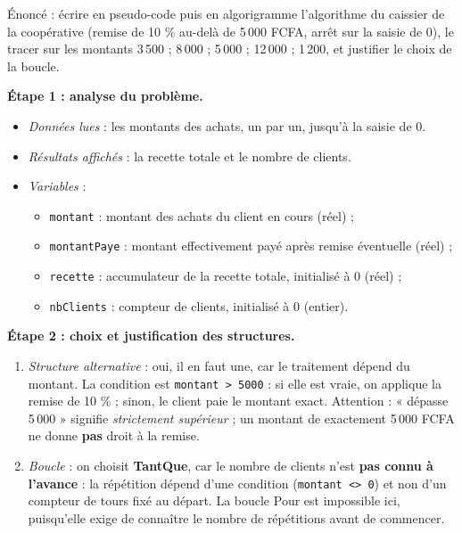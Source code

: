 \documentclass[11pt]{article}
\begin{document}
\begin{exoresolu}
Énoncé : écrire en pseudo-code puis en algorigramme l'algorithme du caissier de la coopérative (remise de 10 \% au-delà de 5\,000 FCFA, arrêt sur la saisie de 0), le tracer sur les montants 3\,500 ; 8\,000 ; 5\,000 ; 12\,000 ; 1\,200, et justifier le choix de la boucle.

\tcblower

\textbf{Étape 1 : analyse du problème.}

\begin{itemize}
\item \emph{Données lues} : les montants des achats, un par un, jusqu'à la saisie de 0.
\item \emph{Résultats affichés} : la recette totale et le nombre de clients.
\item \emph{Variables} :
\begin{itemize}
\item \texttt{montant} : montant des achats du client en cours (réel) ;
\item \texttt{montantPaye} : montant effectivement payé après remise éventuelle (réel) ;
\item \texttt{recette} : accumulateur de la recette totale, initialisé à 0 (réel) ;
\item \texttt{nbClients} : compteur de clients, initialisé à 0 (entier).
\end{itemize}
\end{itemize}

\textbf{Étape 2 : choix et justification des structures.}

\begin{enumerate}
\item \emph{Structure alternative} : oui, il en faut une, car le traitement dépend du montant. La condition est \texttt{montant > 5000} : si elle est vraie, on applique la remise de 10 \% ; sinon, le client paie le montant exact. Attention : « dépasse 5\,000 » signifie \emph{strictement supérieur} ; un montant de exactement 5\,000 FCFA ne donne \textbf{pas} droit à la remise.
\item \emph{Boucle} : on choisit \textbf{TantQue}, car le nombre de clients n'est \textbf{pas connu à l'avance} : la répétition dépend d'une condition (\texttt{montant <> 0}) et non d'un compteur de tours fixé au départ. La boucle Pour est impossible ici, puisqu'elle exige de connaître le nombre de répétitions avant de commencer.
\end{enumerate}


\end{exoresolu}
\end{document}
